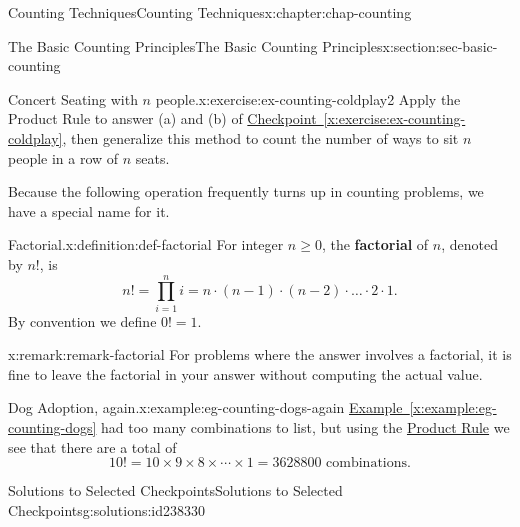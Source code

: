 \documentclass[oneside,10pt,]{book}
\newcommand{\blocktitlefont}{\relax}
\newcommand{\tabularfont}{\relax}
\newcommand{\xreffont}{\relax}
\newcommand{\terminology}[1]{\textbf{#1}}
\numberwithin{equation}{section}
\begin{document}
\begin{chapterptx}{Counting Techniques}{}{Counting Techniques}{}{}{x:chapter:chap-counting}
\begin{sectionptx}{The Basic Counting Principles}{}{The Basic Counting Principles}{}{}{x:section:sec-basic-counting}
\begin{inlineexercise}{Concert Seating with \(n\) people.}{x:exercise:ex-counting-coldplay2}
Apply the Product Rule to answer (a) and (b) of \hyperref[x:exercise:ex-counting-coldplay]{Checkpoint~{\xreffont\ref{x:exercise:ex-counting-coldplay}}}, then generalize this method to count the number of ways to sit \(n\) people in a row of \(n\) seats.%
\end{inlineexercise}
Because the following operation frequently turns up in counting problems, we have a special name for it.%
\begin{definition}{Factorial.}{x:definition:def-factorial}%
For integer \(n \geq 0\), the \terminology{factorial} of \(n\), denoted by \(n!\), is%
\begin{equation*}
n! = \prod_{i=1}^n i = n \cdot (n-1) \cdot (n-2) \cdot \ldots \cdot 2 \cdot 1\text{.}
\end{equation*}
By convention we define \(0! = 1\).%
\label{x:notation:not-factorial}%
\end{definition}
\begin{remark}{}{x:remark:remark-factorial}%
For problems where the answer involves a factorial, it is fine to leave the factorial in your answer without computing the actual value.%
\end{remark}
\begin{example}{Dog Adoption, again.}{x:example:eg-counting-dogs-again}%
\hyperref[x:example:eg-counting-dogs]{Example~{\xreffont\ref{x:example:eg-counting-dogs}}} had too many combinations to list, but using the \hyperref[x:principle:prin-prod-rule]{Product Rule} we see that there are a total of%
\begin{equation*}
10! = 10 \times 9 \times 8 \times \cdots \times 1 = 3628800 \text{ combinations}\text{.}
\end{equation*}
%
\end{example}
%
%
\typeout{************************************************}
\typeout{************************************************}
%
\begin{solutions-subsection}{Solutions to Selected Checkpoints}{}{Solutions to Selected Checkpoints}{}{}{g:solutions:id238330}
\end{solutions-subsection}
\end{sectionptx}
\end{chapterptx}
\end{document}
